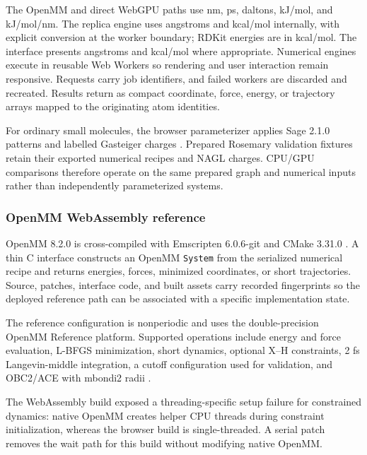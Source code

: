 \documentclass[11pt]{article}
\begin{document}
\begin{small}
The OpenMM and direct WebGPU paths use nm, ps, daltons, kJ/mol, and kJ/mol/nm. The replica engine uses angstroms and kcal/mol internally, with explicit conversion at the worker boundary; RDKit energies are in kcal/mol. The interface presents angstroms and kcal/mol where appropriate. Numerical engines execute in reusable Web Workers so rendering and user interaction remain responsive. Requests carry job identifiers, and failed workers are discarded and recreated. Results return as compact coordinate, force, energy, or trajectory arrays mapped to the originating atom identities.

For ordinary small molecules, the browser parameterizer applies Sage 2.1.0 patterns and labelled Gasteiger charges \citep{boothroyd2023sage,gasteiger1980charges}. Prepared Rosemary validation fixtures retain their exported numerical recipes and NAGL charges. CPU/GPU comparisons therefore operate on the same prepared graph and numerical inputs rather than independently parameterized systems.

\subsubsection{OpenMM WebAssembly reference}

OpenMM 8.2.0 is cross-compiled with Emscripten 6.0.6-git and CMake 3.31.0 \citep{eastman2017openmm7,eastman2024openmm8}. A thin C interface constructs an OpenMM \texttt{System} from the serialized numerical recipe and returns energies, forces, minimized coordinates, or short trajectories. Source, patches, interface code, and built assets carry recorded fingerprints so the deployed reference path can be associated with a specific implementation state.

The reference configuration is nonperiodic and uses the double-precision OpenMM Reference platform. Supported operations include energy and force evaluation, L-BFGS minimization, short dynamics, optional X--H constraints, 2 fs Langevin-middle integration, a cutoff configuration used for validation, and OBC2/ACE with mbondi2 radii \citep{onufriev2004gb}.

The WebAssembly build exposed a threading-specific setup failure for constrained dynamics: native OpenMM creates helper CPU threads during constraint initialization, whereas the browser build is single-threaded. A serial patch removes the wait path for this build without modifying native OpenMM.


\end{small}
\end{document}
